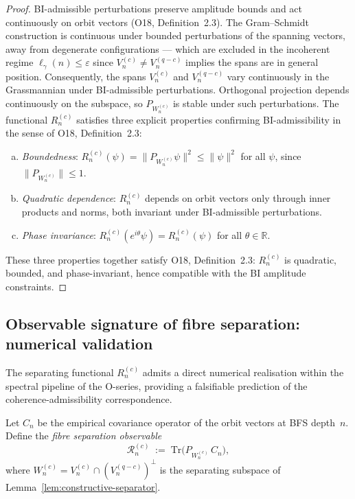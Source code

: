     \begin{proof}
      BI-admissible perturbations preserve amplitude bounds and act continuously
      on orbit vectors (O18, Definition~2.3).
      The Gram--Schmidt construction is continuous under bounded perturbations
      of the spanning vectors, away from degenerate configurations — which are
      excluded in the incoherent regime $\ell_\gamma(n) \leq \varepsilon$ since
      $V_n^{(c)} \neq V_n^{(q-c)}$ implies the spans are in general position.
      Consequently, the spans $V_n^{(c)}$ and $V_n^{(q-c)}$ vary continuously
      in the Grassmannian under BI-admissible perturbations.
      Orthogonal projection depends continuously on the subspace, so
      $P_{W_n^{(c)}}$ is stable under such perturbations.
      The functional $R_n^{(c)}$ satisfies three explicit properties confirming
      BI-admissibility in the sense of O18, Definition~2.3:
      \begin{enumerate}[(a)]
  \item \emph{Boundedness}: $R_n^{(c)}(\psi) = \|P_{W_n^{(c)}}\psi\|^2
  \leq \|\psi\|^2$ for all $\psi$, since $\|P_{W_n^{(c)}}\| \leq 1$.
  \item \emph{Quadratic dependence}: $R_n^{(c)}$ depends on orbit vectors
  only through inner products and norms, both invariant under
  BI-admissible perturbations.
  \item \emph{Phase invariance}: $R_n^{(c)}(e^{i\theta}\psi) = R_n^{(c)}(\psi)$
  for all $\theta \in \mathbb{R}$.
      \end{enumerate}
      These three properties together satisfy O18, Definition~2.3:
      $R_n^{(c)}$ is quadratic, bounded, and phase-invariant,
      hence compatible with the BI amplitude constraints.
    \end{proof}

  \subsection{Observable signature of fibre separation: numerical validation}
    \label{subsec:observable-signature}

    The separating functional $R_n^{(c)}$ admits a direct numerical realisation
    within the spectral pipeline of the O-series, providing a falsifiable
    prediction of the coherence-admissibility correspondence.

    Let $C_n$ be the empirical covariance operator of the orbit vectors at
    BFS depth~$n$.
    Define the \emph{fibre separation observable}
    \begin{equation}
      \label{eq:fibre-sep-obs}
      \mathcal{R}_n^{(c)} \;:=\; \mathrm{Tr}\bigl(P_{W_n^{(c)}}\, C_n\bigr),
    \end{equation}
    where $W_n^{(c)} = V_n^{(c)} \cap (V_n^{(q-c)})^\perp$ is the separating
    subspace of Lemma~\ref{lem:constructive-separator}.

